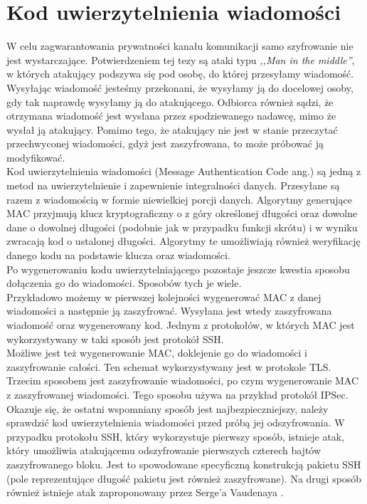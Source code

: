 \section{Kod uwierzytelnienia wiadomości}
W celu zagwarantowania prywatności kanału komunikacji samo szyfrowanie nie jest wystarczające. 
Potwierdzeniem tej tezy są ataki typu \textit{,,Man in the middle''}, w których atakujący podszywa się 
pod osobę, do której przesyłamy wiadomość. Wysyłając wiadomość jesteśmy przekonani, że wysyłamy ją do docelowej osoby,
gdy tak naprawdę wysyłamy ją do atakującego. Odbiorca również sądzi, że otrzymana wiadomość jest wysłana 
przez spodziewanego nadawcę, mimo że wysłał ją atakujący. Pomimo tego, że atakujący nie jest w stanie przeczytać
przechwyconej wiadomości, gdyż jest zaszyfrowana, to może próbować ją modyfikować. \\
Kod uwierzytelnienia wiadomości (Message Authentication Code ang.) są jedną z metod na uwierzytelnienie i zapewnienie 
integralności danych. Przesyłane są razem z wiadomością w formie niewielkiej porcji danych.
Algorytmy generujące MAC przyjmują klucz kryptograficzny o z góry określonej długości oraz dowolne dane 
o dowolnej długości (podobnie jak w przypadku funkcji skrótu) i w wyniku zwracają kod o ustalonej długości.
Algorytmy te umożliwiają również weryfikację danego kodu na podstawie klucza oraz wiadomości. \\
Po wygenerowaniu kodu uwierzytelniającego pozostaje jeszcze kwestia sposobu dołączenia go do wiadomości.
Sposobów tych je wiele. \\
Przykładowo możemy w pierwszej kolejności wygenerować MAC z danej wiadomości a następnie ją zaszyfrować. 
Wysyłana jest wtedy zaszyfrowana wiadomość oraz wygenerowany kod. Jednym z protokołów, w których 
MAC jest wykorzystywany w taki sposób jest protokół SSH. \\
Możliwe jest też wygenerowanie MAC, doklejenie go do wiadomości i zaszyfrowanie całości.
Ten schemat wykorzystywany jest w protokole TLS. \\
Trzecim sposobem jest zaszyfrowanie wiadomości, po czym wygenerowanie MAC z zaszyfrowanej wiadomości.
Tego sposobu używa na przykład protokół IPSec. \\
Okazuje się, że ostatni wspomniany sposób jest najbezpieczniejszy, należy sprawdzić kod uwierzytelnienia wiadomości
przed próbą jej odszyfrowania. W przypadku protokołu SSH, który wykorzystuje pierwszy sposób, istnieje atak, 
który umożliwia atakującemu odszyfrowanie pierwszych czterech bajtów zaszyfrowanego bloku. Jest to spowodowane 
specyficzną konstrukcją pakietu SSH (pole reprezentujące długość pakietu jest również zaszyfrowane).
Na drugi sposób również istnieje atak zaproponowany przez Serge'a Vaudenaya \cite{tls}.

